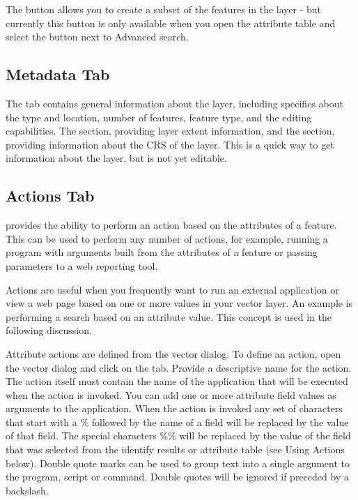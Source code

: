 The  button allows you to create a subset of the
features in the layer - but currently this button is only available when you
open the attribute table and select the  button next to Advanced
search.

\subsection{Metadata Tab}

The  tab contains general information about the layer,
including specifics about the type and location, number of features, feature
type, and the editing capabilities. The  section,
providing
layer extent information, and the 
section, providing information about the CRS of the layer. This is a quick
way to get information about the layer, but is not yet editable.

\subsection{Actions Tab}\label{label_actions}

\qg provides the ability to perform an action based on the attributes of a
feature. This can be used to perform any number of actions, for example,
running a program with arguments built from the attributes of a feature or
passing parameters to a web reporting tool.

Actions are useful when you frequently want to run an external application or
view a web page based on one or more values in your vector layer. An example
is performing a search based on an attribute value. This concept is used in
the following discussion.


Attribute actions are defined from the vector  dialog. To
define an action, open the vector  dialog and click on the
 tab. Provide a descriptive name for the action. The action
itself must contain the name of the application that will be executed when the
action is invoked. You can add one or more attribute field values as arguments
to the application. When the action is invoked any set of characters that
start with a \% followed by the name of a field will be replaced by the value of
that field. The special characters \%\% \index{\%\%}will be replaced by the value
of the field that was selected from the identify results or attribute table (see
Using Actions below).  Double quote marks can be used to group text into a
single argument to the program, script or command. Double quotes will be
ignored if preceded by a backslash.

